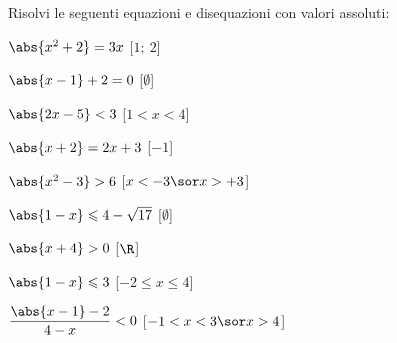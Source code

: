 \begin{esercizio}\label{ese:03.1}
Risolvi le seguenti equazioni e disequazioni con valori assoluti:
\begin{multicols}{2}
\begin{enumeratea}
\item \(\abs{x^2+2} = 3x\) \hfill [\(1;~2\)]
\item \(\abs{x-1}+2 = 0\) \hfill [\(\emptyset\)]
\item \(\abs{2x-5} < 3\) \hfill [\(1 < x < 4\)]
\item \(\abs{x+2} = 2x+3\) \hfill [\(-1\)]
\item \(\abs{x^2-3} > 6\) \hfill [\(x < -3 \sor x > +3\)]
\item \(\abs{1-x} \leqslant 4 - \sqrt{17}\) \hfill [\(\emptyset\)]
\item \(\abs{x+4} > 0\) \hfill [\(\R\)]
\item \(\abs{1-x} \leqslant 3\) \hfill [\(-2 \leqslant x \leqslant 4\)]
\item \(\dfrac{\abs{x-1}-2}{4-x} < 0 \) \hfill [\(-1 < x < 3 \sor x > 4\)]
\end{enumeratea}
\end{multicols}
\end{esercizio}

